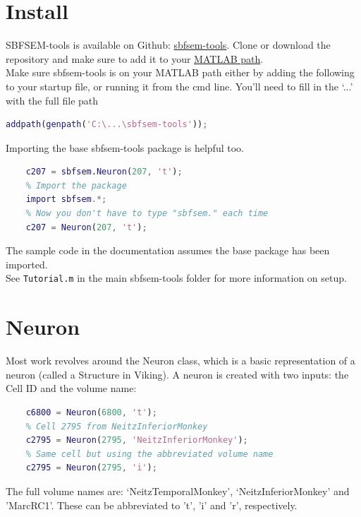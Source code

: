 \documentclass[12pt]{exam}
\begin{document}
	\section{Install}
	SBFSEM-tools is available on Github: \href{http://github.com/sarastokes/sbfsem-tools}{sbfsem-tools}. Clone or download the repository and make sure to add it to your \href{https://www.mathworks.com/help/matlab/ref/addpath.html}{MATLAB path}.\\
	Make sure sbfsem-tools is on your MATLAB path either by adding the following to your startup file, or running it from the cmd line. You'll need to fill in the `...' with the full file path
	\begin{lstlisting}[language=matlab]
	addpath(genpath('C:\...\sbfsem-tools'));\end{lstlisting}
	Importing the base sbfsem-tools package is helpful too.
	\begin{lstlisting}[language=matlab]
	% Without importing the package
	c207 = sbfsem.Neuron(207, 't');
	% Import the package
	import sbfsem.*;
	% Now you don't have to type "sbfsem." each time
	c207 = Neuron(207, 't');\end{lstlisting}
	The sample code in the documentation assumes the base package has been imported.\\
	See \texttt{Tutorial.m} in the main sbfsem-tools folder for more information on setup.\\
	\section{Neuron}
	Most work revolves around the Neuron class, which is a basic representation of a neuron (called a Structure in Viking). A neuron is created with two inputs: the Cell ID and the volume name:
	\begin{lstlisting}[language=matlab]
	% Cell 6800 from NeitzTemporalMonkey
	c6800 = Neuron(6800, 't');
	% Cell 2795 from NeitzInferiorMonkey
	c2795 = Neuron(2795, 'NeitzInferiorMonkey');
	% Same cell but using the abbreviated volume name
	c2795 = Neuron(2795, 'i');\end{lstlisting}
	The full volume names are: `NeitzTemporalMonkey', `NeitzInferiorMonkey' and 'MarcRC1'. These can be abbreviated to 't', 'i' and 'r', respectively.
\end{document}
